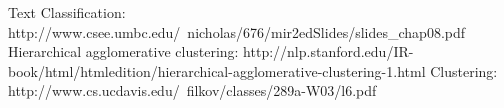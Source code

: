 \documentclass[paper=a4, fontsize=11pt]{scrartcl}
\numberwithin{equation}{section}		%
\numberwithin{figure}{section}			%
\numberwithin{table}{section}				%
\begin{document}
\clearpage

\begin{thebibliography}{1}

 Text Classification: http://www.csee.umbc.edu/~nicholas/676/mir2edSlides/slides\_chap08.pdf
 Hierarchical agglomerative clustering: http://nlp.stanford.edu/IR-book/html/htmledition/hierarchical-agglomerative-clustering-1.html
 Clustering: http://www.cs.ucdavis.edu/~filkov/classes/289a-W03/l6.pdf

\end{thebibliography}

\end{document}
